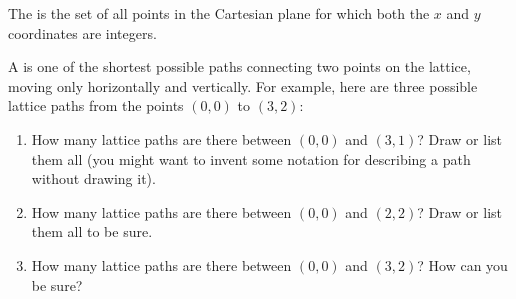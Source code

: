 \documentclass{book}
\begin{document}
\setcounter{project}{64}
\addtocounter{project}{-1}
\begin{activity}[]\label{act-latticepaths}
\hypertarget{p-499}{}%
The  is the set of all points in the Cartesian plane for which both the \(x\) and \(y\) coordinates are integers.%
\par
\hypertarget{p-500}{}%
A  is one of the shortest possible paths connecting two points on the lattice, moving only horizontally and vertically. For example, here are three possible lattice paths from the points \((0,0)\) to \((3,2)\):%
\begin{sidebyside}{3}{0.0166666666666667}{0.0166666666666667}{0.0333333333333333}
\begin{sbspanel}{0.3}
\end{sbspanel}
\begin{sbspanel}{0.3}
\end{sbspanel}
\begin{sbspanel}{0.3}
\end{sbspanel}
\end{sidebyside}
\begin{enumerate}[font=\bfseries,label=(\alph*),ref=\alph*]
\item\label{task-78} \hypertarget{p-501}{}%
How many lattice paths are there between \((0,0)\) and \((3,1)\)?  Draw or list them all (you might want to invent some notation for describing a path without drawing it).%
\item\label{task-79} \hypertarget{p-502}{}%
How many lattice paths are there between \((0,0)\) and \((2,2)\)? Draw or list them all to be sure.%
\item\label{task-80} \hypertarget{p-503}{}%
How many lattice paths are there between \((0,0)\) and \((3,2)\)? How can you be sure?%
\end{enumerate}
\end{activity}

\clearpage
\end{document}

